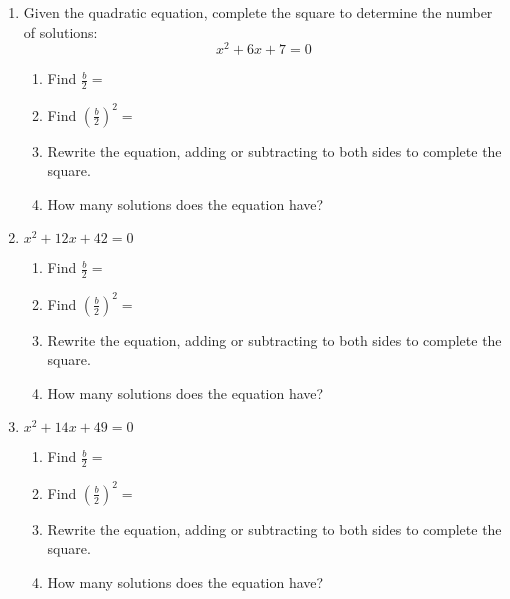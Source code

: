\documentclass[12pt, twoside]{article}
\begin{document}
\begin{enumerate}
\newpage
\item Given the quadratic equation, complete the square to determine the number of solutions: $$x^2 + 6x + 7 = 0$$
    \begin{enumerate}
        \item Find $\displaystyle \frac{b}{2}=$
        \item Find $\displaystyle \left( \frac{b}{2} \right)^2=$

        \item Rewrite the equation, adding or subtracting to both sides to complete the square. \vspace{1.5cm}
        \item How many solutions does the equation have? \vspace{0.5cm}
    \end{enumerate}

\item \hspace{5cm} $x^2 + 12x + 42 = 0$
    \begin{enumerate}
        \item Find $\displaystyle \frac{b}{2}=$
        \item Find $\displaystyle \left( \frac{b}{2} \right)^2=$

        \item Rewrite the equation, adding or subtracting to both sides to complete the square. \vspace{1.5cm}
        \item How many solutions does the equation have? \vspace{0.5cm}
    \end{enumerate}

\item \hspace{5cm} $x^2 + 14x + 49 = 0$
    \begin{enumerate}
        \item Find $\displaystyle \frac{b}{2}=$
        \item Find $\displaystyle \left( \frac{b}{2} \right)^2=$

        \item Rewrite the equation, adding or subtracting to both sides to complete the square. \vspace{1.5cm}
        \item How many solutions does the equation have? \vspace{0.5cm}
    \end{enumerate}


\end{enumerate}
\end{document}
